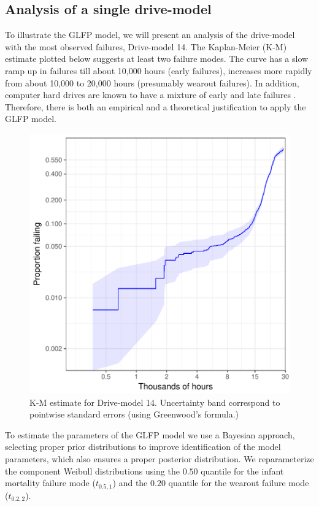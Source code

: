 \documentclass[12pt]{article}
\begin{document}
\subsection{Analysis of a single drive-model}
\label{subsec:ex1}
To illustrate the GLFP model, we will present an analysis of the drive-model with the most observed failures, Drive-model 14.  The Kaplan-Meier (K-M) estimate plotted below suggests at least two failure modes.  The curve has a slow ramp up in failures till about 10,000 hours (early failures), increases more rapidly from about 10,000 to 20,000 hours (presumably wearout failures).  In addition, computer hard drives are known to have a mixture of early and late failures \citep{chan}.  Therefore, there is both an empirical and a theoretical justification to apply the GLFP model.

\begin{figure}[H]
\centering
  \includegraphics[width=.6\textwidth]{km14-prob}
  \caption{K-M estimate for Drive-model 14.  Uncertainty band correspond to pointwise standard errors (using Greenwood's formula.)}
  \label{fig1}
\end{figure}


To estimate the parameters of the GLFP model we use a Bayesian approach, selecting proper prior distributions to improve identification of the model parameters, which also ensures a proper posterior distribution. We reparameterize the component Weibull distributions using the $0.50$ quantile for the infant mortality failure mode ($t_{0.5,1}$) and the $0.20$ quantile for the wearout failure mode ($t_{0.2,2}$). \\
\end{document}
